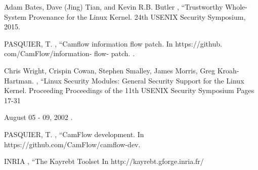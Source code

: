 \documentclass{IEEEtran}
\begin{document}
\begin{thebibliography}{00}
 Adam Bates, Dave (Jing) Tian, and Kevin R.B. Butler , ``Trustworthy Whole-System Provenance
for the Linux Kernel.
24th USENIX Security Symposium, 2015.








 PASQUIER, T. , ``Camflow information flow patch.
In https://github. com/CamFlow/information- flow- patch.
.


 	Chris Wright,	
Crispin Cowan,	
Stephen Smalley,	
James Morris,	
Greg Kroah-Hartman.	
, ``Linux Security Modules: General Security Support for the Linux Kernel.
Proceeding
Proceedings of the 11th USENIX Security Symposium
Pages 17-31 

August 05 - 09, 2002 .


 PASQUIER, T. , ``CamFlow development.
In https://github.com/CamFlow/camflow-dev.

 INRIA , ``The Kayrebt Toolset
In http://kayrebt.gforge.inria.fr/
\end{thebibliography}
\end{document}
